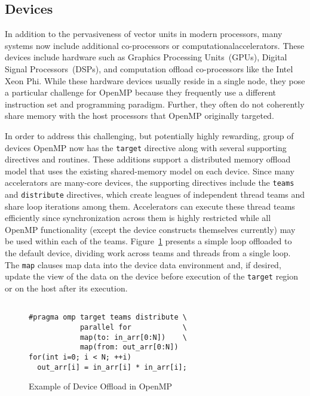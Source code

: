 \subsection{Devices}
\label{sub:devices}

In addition to the pervasiveness of vector units in modern processors, many
systems now include additional co-processors or computationalaccelerators.  
These devices include hardware such as Graphics Processing Units~(GPUs), 
Digital Signal Processors~(DSPs), and computation offload co-processors 
like the Intel Xeon Phi. While these hardware devices usually reside in 
a single node, they pose a particular challenge for OpenMP because they 
frequently use a different instruction set and programming paradigm. Further,
they often do not coherently share memory with the host processors that
OpenMP originally targeted.

In order to address this challenging, but potentially highly rewarding, 
group of devices OpenMP now has the \texttt{target} directive along with 
several supporting directives and routines. These additions support a 
distributed memory offload model that uses the existing shared-memory 
model on each device. Since many accelerators are many-core devices, the
supporting directives include the \texttt{teams} and \texttt{distribute} 
directives, which create leagues of independent thread teams and share 
loop iterations among them. Accelerators can execute these thread teams 
efficiently since synchronization across them is highly restricted while
all OpenMP functionality (except the device constructs themselves currently)
may be used within each of the teams. Figure~\ref{fig:target-loop} presents 
a simple loop offloaded to the default device, dividing work across teams 
and threads from a single loop. The \texttt{map} clauses map data into the 
device data environment and, if desired, update the view of the data on the 
device before execution of the \texttt{target} region or on the host after 
its execution.

\begin{figure}
\begin{verbatim}

#pragma omp target teams distribute \
            parallel for            \
            map(to: in_arr[0:N])    \
            map(from: out_arr[0:N])
for(int i=0; i < N; ++i)
  out_arr[i] = in_arr[i] * in_arr[i];
\end{verbatim}
\caption{Example of Device Offload in OpenMP}
\label{fig:target-loop}
\end{figure}


